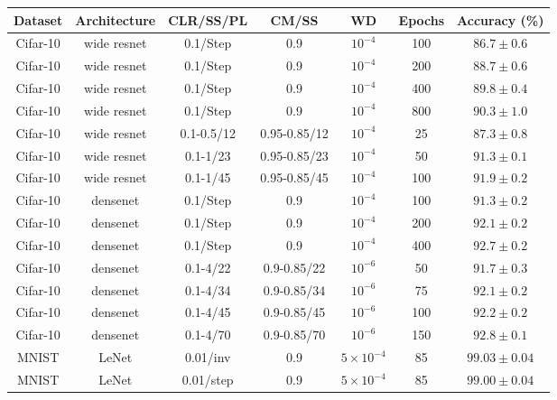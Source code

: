 \documentclass{article} %
\begin{document}
\begin{table}[tb]
	\begin{center}
		\begin{tabular}{| c | c | c | c | c | c | c | }
			\hline
			Dataset & Architecture & CLR/SS/PL  & CM/SS & WD & Epochs & Accuracy (\%) \\ \hline
			Cifar-10 & wide resnet & 0.1/Step  & 0.9  & $10^{-4}$  &  100 & $ 86.7 \pm 0.6 $   \\ \hline
			Cifar-10 & wide resnet & 0.1/Step  & 0.9  & $10^{-4}$  &  200 & $ 88.7 \pm 0.6 $   \\ \hline
			Cifar-10 & wide resnet & 0.1/Step  & 0.9  & $10^{-4}$  &  400 & $ 89.8 \pm 0.4 $   \\ \hline
			Cifar-10 & wide resnet & 0.1/Step  & 0.9  & $10^{-4}$  &  800 & $ 90.3 \pm 1.0 $   \\ \hline
			Cifar-10 & wide resnet & 0.1-0.5/12  & 0.95-0.85/12 & $10^{-4}$ &  25 & $ 87.3 \pm 0.8 $   \\ \hline
			Cifar-10 & wide resnet & 0.1-1/23  & 0.95-0.85/23 & $10^{-4}$  &   50 & $ 91.3 \pm 0.1 $   \\ \hline
			Cifar-10 & wide resnet & 0.1-1/45  & 0.95-0.85/45 & $10^{-4}$  &  100 & $ 91.9 \pm 0.2 $   \\ \hline
			\hline   
			Cifar-10 & densenet & 0.1/Step  & 0.9 & $10^{-4}$  &  100 & $ 91.3 \pm 0.2 $   \\ \hline
			Cifar-10 & densenet & 0.1/Step  & 0.9 & $10^{-4}$  &  200 & $ 92.1 \pm 0.2 $   \\ \hline
			Cifar-10 & densenet & 0.1/Step  & 0.9 & $10^{-4}$  &  400 & $ 92.7 \pm 0.2 $   \\ \hline
			Cifar-10 & densenet & 0.1-4/22  & 0.9-0.85/22 & $10^{-6}$  &  50 & $ 91.7 \pm 0.3 $   \\ \hline
			Cifar-10 & densenet & 0.1-4/34  & 0.9-0.85/34 & $10^{-6}$  &  75 & $ 92.1 \pm 0.2 $   \\ \hline
			Cifar-10 & densenet & 0.1-4/45  & 0.9-0.85/45 & $10^{-6}$  &  100 & $ 92.2 \pm 0.2 $   \\ \hline
			Cifar-10 & densenet & 0.1-4/70  & 0.9-0.85/70 & $10^{-6}$  &  150 & $ 92.8 \pm 0.1 $   \\ \hline
			\hline   
			MNIST  & LeNet & 0.01/inv & 0.9  & $5 \times 10^{-4}$  &  85 & $ 99.03 \pm 0.04 $   \\ \hline
			MNIST  & LeNet & 0.01/step  & 0.9  & $5 \times 10^{-4}$  &  85 & $ 99.00 \pm 0.04 $   \\ \hline

\end{tabular}
\end{center}
\end{table}
\end{document}
